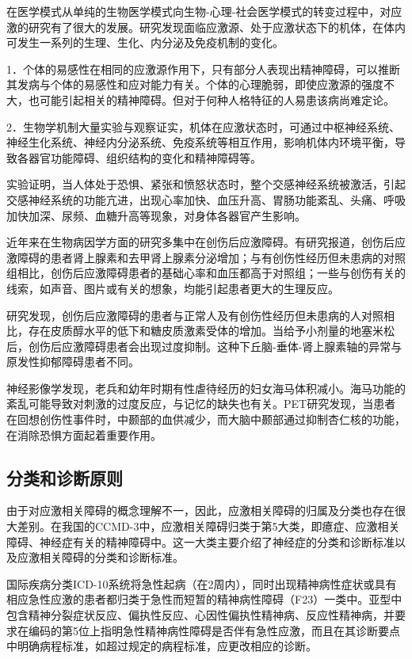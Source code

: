 在医学模式从单纯的生物医学模式向生物-心理-社会医学模式的转变过程中，对应激的研究有了很大的发展。研究发现面临应激源、处于应激状态下的机体，在体内可发生一系列的生理、生化、内分泌及免疫机制的变化。

1．个体的易感性在相同的应激源作用下，只有部分人表现出精神障碍，可以推断其发病与个体的易感性和应对能力有关。个体的心理脆弱，即使应激源的强度不大，也可能引起相关的精神障碍。但对于何种人格特征的人易患该病尚难定论。

2．生物学机制大量实验与观察证实，机体在应激状态时，可通过中枢神经系统、神经生化系统、神经内分泌系统、免疫系统等相互作用，影响机体内环境平衡，导致各器官功能障碍、组织结构的变化和精神障碍等。

实验证明，当人体处于恐惧、紧张和愤怒状态时，整个交感神经系统被激活，引起交感神经系统的功能亢进，出现心率加快、血压升高、胃肠功能紊乱、头痛、呼吸加快加深、尿频、血糖升高等现象，对身体各器官产生影响。

近年来在生物病因学方面的研究多集中在创伤后应激障碍。有研究报道，创伤后应激障碍的患者肾上腺素和去甲肾上腺素分泌增加；与有创伤性经历但未患病的对照组相比，创伤后应激障碍患者的基础心率和血压都高于对照组；一些与创伤有关的线索，如声音、图片或有关的想象，均能引起患者更大的生理反应。

研究发现，创伤后应激障碍的患者与正常人及有创伤性经历但未患病的人对照相比，存在皮质醇水平的低下和糖皮质激素受体的增加。当给予小剂量的地塞米松后，创伤后应激障碍患者会出现过度抑制。这种下丘脑-垂体-肾上腺素轴的异常与原发性抑郁障碍患者不同。

神经影像学发现，老兵和幼年时期有性虐待经历的妇女海马体积减小。海马功能的紊乱可能导致对刺激的过度反应，与记忆的缺失也有关。PET研究发现，当患者在回想创伤性事件时，中颞部的血供减少，而大脑中颞部通过抑制杏仁核的功能，在消除恐惧方面起着重要作用。

\subsection{分类和诊断原则}

由于对应激相关障碍的概念理解不一，因此，应激相关障碍的归属及分类也存在很大差别。在我国的CCMD-3中，应激相关障碍归类于第5大类，即癔症、应激相关障碍、神经症有关的精神障碍中。这一大类主要介绍了神经症的分类和诊断标准以及应激相关障碍的分类和诊断标准。

国际疾病分类ICD-10系统将急性起病（在2周内），同时出现精神病性症状或具有相应急性应激的患者都归类于急性而短暂的精神病性障碍（F23）一类中。亚型中包含精神分裂症状反应、偏执性反应、心因性偏执性精神病、反应性精神病，并要求在编码的第5位上指明急性精神病性障碍是否伴有急性应激，而且在其诊断要点中明确病程标准，如超过规定的病程标准，应更改相应的诊断。

